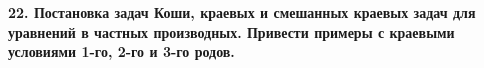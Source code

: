 \documentclass[a4paper,14pt]{article}
\begin{document}
\textbf{22. Постановка задач Коши, краевых  и смешанных краевых задач для уравнений в частных производных. Привести примеры с краевыми условиями 1-го, 2-го и 3-го родов.}
\newpage
\begin{figure}[!h]
	\label{fig:t221}
\end{figure}
\newpage
\end{document}
